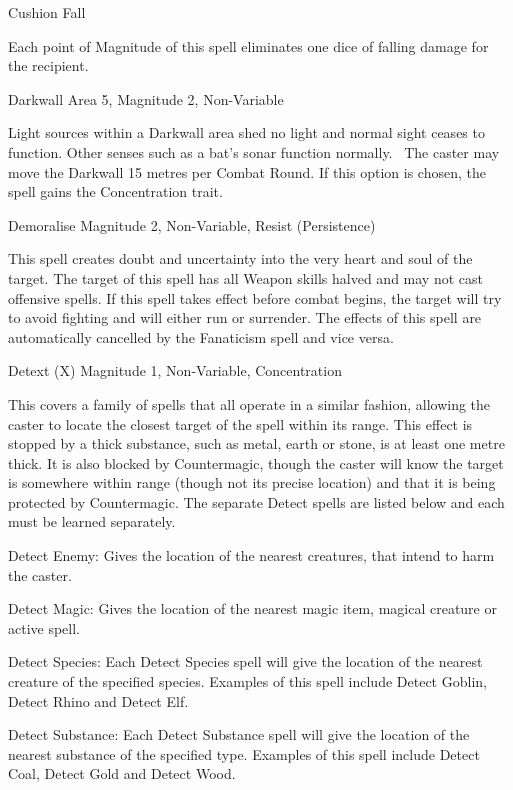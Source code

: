 \begin{rpg-spell}
{Cushion Fall}
{}

Each point of Magnitude of this spell eliminates one dice of falling damage for the recipient.
\end{rpg-spell}


\begin{rpg-spell}
{Darkwall}
{Area 5, Magnitude 2, Non-Variable}

Light sources within a Darkwall area shed no light and normal sight ceases to function. Other senses such as a bat’s sonar function normally. 
The caster may move the Darkwall 15 metres per Combat Round. If this option is chosen, the spell gains the Concentration trait. 
\end{rpg-spell}


\begin{rpg-spell}
{Demoralise}
{Magnitude 2, Non-Variable, Resist (Persistence)}

This spell creates doubt and uncertainty into the very heart and soul of the target. The target of this spell has all Weapon skills halved and may not cast offensive spells. If this spell takes effect before combat begins, the target will try to avoid fighting and will either run or surrender. The effects of this spell are automatically cancelled by the Fanaticism spell and vice versa. 
\end{rpg-spell}


\begin{rpg-spell}
{Detext (X)}
{Magnitude 1, Non-Variable, Concentration}

This covers a family of spells that all operate in a similar fashion, allowing the caster to locate the closest target of the spell within its range. This effect is stopped by a thick substance, such as metal, earth or stone, is at least one metre thick. It is also blocked by Countermagic, though the caster will know the target is somewhere within range (though not its precise location) and that it is being protected by Countermagic. The separate Detect spells are listed below and each must be learned separately.

\begin{rpg-list}
\item Detect Enemy: Gives the location of the nearest creatures, that intend to harm the caster. 
\item Detect Magic: Gives the location of the nearest magic item, magical creature or active spell. 
\item Detect Species: Each Detect Species spell will give the location of the nearest creature of the specified species. Examples of this spell include Detect Goblin, Detect Rhino and Detect Elf. 
\item Detect Substance: Each Detect Substance spell will give the location of the nearest substance of the specified type. Examples of this spell include Detect Coal, Detect Gold and Detect Wood. 
\end{rpg-list}
\end{rpg-spell}


